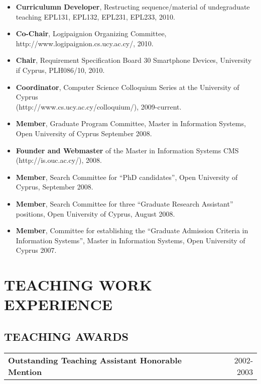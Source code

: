 \documentclass[10pt]{article}
\begin{document}
\begin{itemize}
   \item {\bf Curriculumn Developer}, Restructing sequence/material of undegraduate teaching EPL131, EPL132, EPL231, EPL233, 2010.
   \item {\bf Co-Chair}, Logipaignion Organizing Committee, http://www.logipaignion.cs.ucy.ac.cy/, 2010.
   \item {\bf Chair}, Requirement Specification Board 30 Smartphone Devices, University if Cyprus, PLH086/10, 2010.
   \item {\bf Coordinator}, Computer Science Colloquium Series  at the University of Cyprus \\ (http://www.cs.ucy.ac.cy/colloquium/), 2009-current.
   \item {\bf Member}, Graduate Program Committee, Master in Information Systems, Open University of Cyprus September 2008.   
   \item {\bf Founder and Webmaster} of the Master in Information Systems CMS (http://is.ouc.ac.cy/), 2008.
   \item {\bf Member}, Search Committee for ``PhD candidates'', Open University of Cyprus, September 2008.
   \item {\bf Member}, Search Committee for three ``Graduate Research Assistant'' positions, Open University of Cyprus, August 2008.
   \item {\bf Member}, Committee for establishing the ``Graduate Admission Criteria in Information Systems'', Master in Information Systems, Open University of Cyprus 2007.
   

\end{itemize}		


\newpage


\section{\bf TEACHING WORK EXPERIENCE}

\subsection*{TEACHING AWARDS}
\begin{center}  %
\begin{tabular*}{1.0\textwidth}%
	{@{\extracolsep{\fill}}lr}
{\bf  Outstanding Teaching Assistant Honorable Mention} 	&  	 2002-2003	\\
\end{tabular*}
\end{center}
\end{document}
